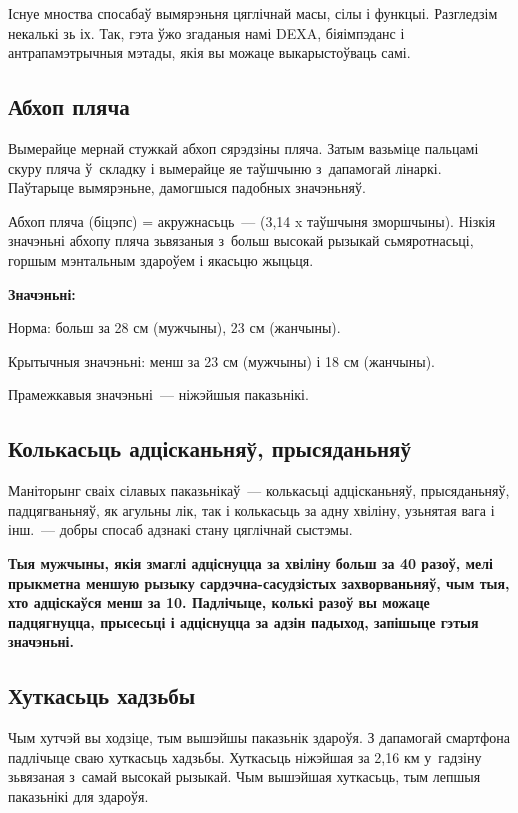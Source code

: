 Існуе мноства спосабаў вымярэньня цяглічнай масы, сілы і функцыі. Разгледзім некалькі зь іх. Так, гэта ўжо згаданыя намі DEXA, біяімпэданс і антрапамэтрычныя мэтады, якія вы можаце выкарыстоўваць самі.

\subsection*{Абхоп пляча}

Вымерайце мернай стужкай абхоп сярэдзіны пляча. Затым вазьміце пальцамі скуру пляча ў~складку і вымерайце яе таўшчыню з~дапамогай лінаркі. Паўтарыце вымярэньне, дамогшыся падобных значэньняў. 

Абхоп пляча (біцэпс) = акружнасьць~--- (3,14 x таўшчыня зморшчыны). Нізкія значэньні абхопу пляча зьвязаныя з~больш высокай рызыкай сьмяротнасьці, горшым мэнтальным здароўем і якасьцю жыцьця.

\textbf{Значэньні:} 

Норма: больш за 28 см (мужчыны), 23 см (жанчыны). 

Крытычныя значэньні: менш за 23 см (мужчыны) і 18 см (жанчыны). 

Прамежкавыя значэньні~--- ніжэйшыя паказьнікі.

\subsection*{Колькасьць адцісканьняў, прысяданьняў}

Маніторынг сваіх сілавых паказьнікаў~--- колькасьці адцісканьняў, прысяданьняў, падцягваньняў, як агульны лік, так і колькасьць за адну хвіліну, узьнятая вага і інш.~--- добры спосаб адзнакі стану цяглічнай сыстэмы. 

\textbf{Тыя мужчыны, якія змаглі адціснуцца за хвіліну больш за 40 разоў, мелі прыкметна меншую рызыку сардэчна-сасудзістых захворваньняў, чым тыя, хто адціскаўся менш за 10. Падлічыце, колькі разоў вы можаце падцягнуцца, прысесьці і адціснуцца за адзін падыход, запішыце гэтыя значэньні.}

\subsection*{Хуткасьць хадзьбы}

Чым хутчэй вы ходзіце, тым вышэйшы паказьнік здароўя. З дапамогай смартфона падлічыце сваю хуткасьць хадзьбы. Хуткасьць ніжэйшая за 2,16 км у~гадзіну зьвязаная з~самай высокай рызыкай. Чым вышэйшая хуткасьць, тым лепшыя паказьнікі для здароўя. 

